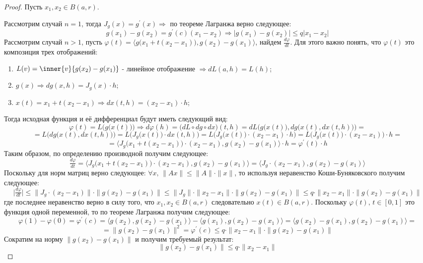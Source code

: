 \documentclass[12pt]{article}
\theoremstyle{definition}
\begin{document}
\begin{proof} Пусть $x_1, x_2 \in B(a,r)$.
	
	Рассмотрим случай $n =1$, тогда $J_g(x) = g^\prime(x) \Rightarrow$ по теореме Лагранжа верно следующее:
	$$
		g(x_1) - g(x_2) = g^\prime(c)(x_1 - x_2) \Rightarrow |g(x_1) - g(x_2)| \leq q|x_1 - x_2|
	$$
	Рассмотрим случай $n > 1$, пусть $\varphi(t) = \big\langle g\big(x_1+ t(x_2 - x_1)\big),g(x_2) - g(x_1)\big\rangle$, найдем $\tfrac{d\varphi}{dt}$. Для этого важно понять, что $\varphi(t)$ это композиция трех отображений:
	\begin{enumerate}[label ={(\arabic*)}]
		\item $L(v) = \inner{v}{g(x_2) - g(x_1)}$ - линейное отображение $\Rightarrow dL(a, h) = L(h)$;
		\item $g(x) \Rightarrow dg(x,h) = J_g(x){\cdot}h$;
		\item $x(t) = x_1 + t(x_2 - x_1) \Rightarrow dx(t,h) = (x_2 - x_1){\cdot}h$;
	\end{enumerate}
	Тогда исходная функция и её дифференциал будут иметь следующий вид:
	$$
		\varphi(t) = L\Big(g\big(x(t)\big) \Big) \Rightarrow d\varphi(h) = \big(dL \circ dg \circ dx\big)(t,h) = dL\Big(g\big(x(t)\big), dg\big(x(t), dx(t,h)\big) \Big) = 
	$$
	$$
		=	L\Big(dg\big(x(t), dx(t,h)\big) \Big) = L\Big(J_g\big(x(t)\big){\cdot}dx(t,h) \Big) = L\Big(J_g\big(x(t)\big){\cdot} (x_2 - x_1){\cdot}h\Big) = L\Big(J_g\big(x(t)\big){\cdot} (x_2 - x_1)\Big){\cdot}h = 
	$$
	$$
		= \big\langle J_g\big(x_1 + t(x_2 - x_1)\big){\cdot}(x_2 - x_1), g(x_2) - g(x_1) \big\rangle{\cdot}h = \varphi^\prime(t){\cdot}h
	$$
	Таким образом, по определению производной получим следующее:
	$$
		\tfrac{d\varphi}{dt} = \big\langle J_g\big(x_1 + t(x_2 - x_1)\big){\cdot}(x_2 - x_1), g(x_2) - g(x_1) \big\rangle = \big\langle J_g{\cdot}(x_2 - x_1), g(x_2) - g(x_1) \big\rangle
	$$
	Поскольку для норм матриц верно следующее: $\forall x, \, \|Ax\| \leq 	\|A\|{\cdot}\|x\|$, то используя неравенство Коши-Буняковского получим следующее:
	$$
		\big|\tfrac{d\varphi}{dt}\big| \leq \|J_g{\cdot}(x_2 - x_1)\| {\cdot}\|g(x_2) - g(x_1)\| \leq \|J_g\|{\cdot}\|x_2 - x_1\|{\cdot}\|g(x_2) - g(x_1)\| \leq q{\cdot}\|x_2 - x_1\|{\cdot}\|g(x_2) - g(x_1)\|
	$$
	где последнее неравенство верно в силу того, что $x_1, x_2 \in B(a,r)$ следовательно $x(t) \in B(a,r)$. Поскольку $\varphi(t), \, t \in [0,1]$ это функция одной переменной, то по теореме Лагранжа получим следующее: 
	$$
		\varphi(1) - \varphi(0) = \varphi^\prime(c) = \big\langle g(x_2),g(x_2) - g(x_1)\big\rangle - \big\langle g(x_1),g(x_2) - g(x_1)\big\rangle = \big\langle g(x_2) - g(x_1),g(x_2) - g(x_1)\big\rangle = 
	$$
	$$
		= \|g(x_2) - g(x_1)\|^2 = \varphi^\prime(c) \leq  q{\cdot}\|x_2 - x_1\|{\cdot}\|g(x_2) - g(x_1)\|
	$$
	Сократим на норму $\|g(x_2) - g(x_1)\|$ и получим требуемый результат:
	$$
		\|g(x_2) - g(x_1)\| \leq q{\cdot}\|x_2 - x_1\|
	$$	
\end{proof}
\end{document}
